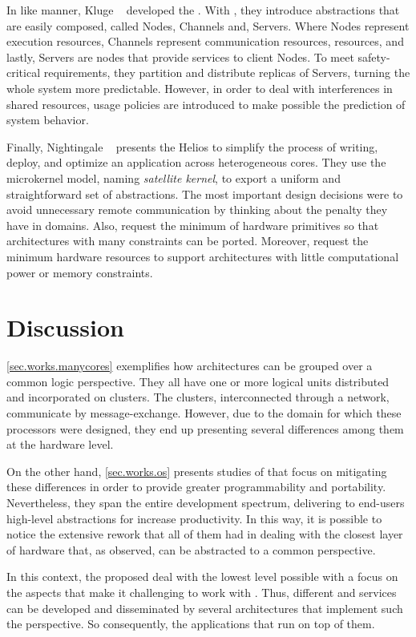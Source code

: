 	In like manner, Kluge \etal~\cite{kluge2014} developed the \moosca.
	With \moosca, they introduce abstractions that are easily composed, called Nodes,
	Channels and, Servers.
	Where Nodes represent execution resources, Channels represent communication
	resources, \eg \noc resources, and lastly, Servers are nodes that provide
	services to client Nodes.
	To meet safety-critical requirements, they partition \manycore and distribute
	replicas of Servers, turning the whole system more predictable.
	However, in order to deal with interferences in shared resources,
	usage policies are introduced to make possible the prediction of system behavior.

	Finally, Nightingale \etal~\cite{nightingale2009} presents the Helios \os to
	simplify the process of writing, deploy, and optimize an application across
	heterogeneous cores.
	They use the microkernel model, naming \textit{satellite kernel}, to export
	a uniform and straightforward set of \os abstractions.
	The most important design decisions were to avoid unnecessary remote communication
	by thinking about the penalty they have in \numa domains.
	Also, request the minimum of hardware primitives so that architectures with many
	constraints can be ported.
	Moreover, request the minimum hardware resources to support architectures with little
	computational power or memory constraints.

\section{Discussion}

	\autoref{sec.works.manycores} exemplifies how \manycore architectures can be
	grouped over a common logic perspective.
	They all have one or more logical units distributed and incorporated on clusters.
	The clusters, interconnected through a network, communicate by message-exchange.
	However, due to the domain for which these processors were designed, they end up
	presenting several differences among them at the hardware level.

	On the other hand, \autoref{sec.works.os} presents studies of \oss that focus on
	mitigating these differences in order to provide greater programmability and portability.
	Nevertheless, they span the entire development spectrum, delivering to end-users
	high-level abstractions for increase productivity.
	In this way, it is possible to notice the extensive rework that all of them had in
	dealing with the closest layer of hardware that, as observed, can be abstracted to
	a common perspective.

	In this context, the proposed \hal deal with the lowest level possible with a focus
	on the aspects that make it challenging to work with \manycores.
	Thus, different \oss and services can be developed and disseminated by several
	architectures that implement such the perspective.
	So consequently, the applications that run on top of them.